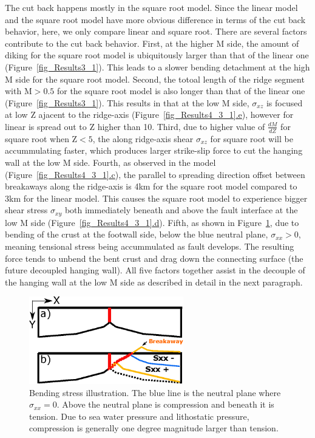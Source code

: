 The cut back happens mostly in the square root model. Since the linear model and the square root model have more obvious difference in terms of the cut back behavior, here, we only compare linear and square root. There are several factors contribute to the cut back behavior. First, at the higher M side, the amount of diking for the square root model is ubiquitously larger than that of the linear one (Figure~\hyperref[fig_Results3_1]{\ref{fig_Results3_1}}). This leads to a slower bending detachment at the high M side for the square root model. Second, the totoal length of the ridge segment with M$>0.5$ for the square root model is also longer than that of the linear one (Figure~\hyperref[fig_Results3_1]{\ref{fig_Results3_1}}). This results in that at the low M side, $\sigma_{xz}$ is focused at low Z ajacent to the ridge-axis (Figure~\hyperref[fig_Results4_3_1]{\ref{fig_Results4_3_1}.e}), however for linear is spread out to Z higher than 10. Third, due to higher value of $\frac{dM}{dZ}$ for square root when Z$<5$, the along ridge-axis shear $\sigma_{xz}$ for square root will be accummulating faster, which produces larger strike-slip force to cut the hanging wall at the low M side. Fourth, as observed in the model (Figure~\hyperref[fig_Results4_3_1]{\ref{fig_Results4_3_1}.c}), the parallel to spreading direction offset between breakaways along the ridge-axis is 4km for the square root model compared to 3km for the linear model. This causes the square root model to experience bigger shear stress $\sigma_{xy}$ both immediately beneath and above the fault interface at the low M side (Figure~\hyperref[fig_Results4_3_1]{\ref{fig_Results4_3_1}.d}). Fifth, as shown in Figure~\hyperref[fig_Results4_8]{\ref{fig_Results4_8}}, due to bending of the crust at the footwall side, below the blue neutral plane, $\sigma_{xx}>0$, meaning tensional stress being accummulated as fault develops. The resulting force tends to unbend the bent crust and drag down the connecting surface (the future decoupled hanging wall). All five factors together assist in the decouple of the hanging wall at the low M side as described in detail in the next paragraph.

\begin{figure}[h]
  \centering
    \includegraphics[width=0.6\textwidth]{./Figures/fig_Results4_8_sqrt_cut_back_bending_cartoon.eps}
  \caption{Bending stress illustration. The blue line is the neutral plane where $\sigma_{xx}=0$. Above the neutral plane is compression and beneath it is tension. Due to sea water pressure and lithostatic pressure, compression is generally one degree magnitude larger than tension.}
 \label{fig_Results4_8}
\end{figure}

